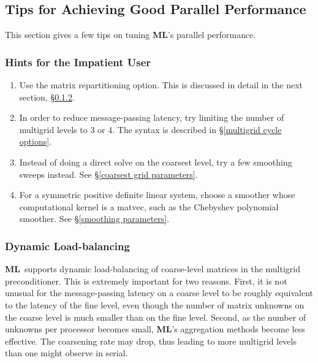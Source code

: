 \documentclass{article}[11pt]
\newcommand{\ML}     {{\bf ML}}
\newcommand{\be}  {\begin{enumerate}}
\newcommand{\ee}  {\end{enumerate}}
\begin{document}
%
\subsection{Tips for Achieving Good Parallel Performance}
\label{parallel performance}
%
This section gives a few tips on tuning \ML's parallel performance.

\subsubsection{Hints for the Impatient User}

\be
   \item Use the matrix repartitioning option.   This is discussed in detail
in the next section, \S\ref{dynamic load balancing}.
   \item In order to reduce message-passing latency, try limiting the number
of multigrid levels to 3 or 4.  The syntax is described in
\S\ref{multigrid cycle options}.
   \item Instead of doing a direct solve on the coarsest level, try a few
smoothing sweeps instead.  See \S\ref{coarsest grid parameters}.
   \item For a symmetric positive definite linear system, choose a
smoother  whose computational kernel is a matvec, such as the Chebyshev
polynomial smoother.  See \S\ref{smoothing parameters}.
\ee

\subsubsection{Dynamic Load-balancing} \label{dynamic load balancing}
\ML\ supports dynamic load-balancing of coarse-level matrices in the multigrid
preconditioner.
This is extremely important for two reasons.
First, it is not unusual for the message-passing latency on a coarse level
to be roughly equivalent to the latency of the fine level,
even though the number of matrix unknowns on the coarse level is much smaller
than on the fine level.
Second, as the number of unknowns per processor becomes small, \ML's
aggregation methods become less effective.
The coarsening rate may drop, thus leading to more multigrid levels than one
might observe in serial.
\end{document}

